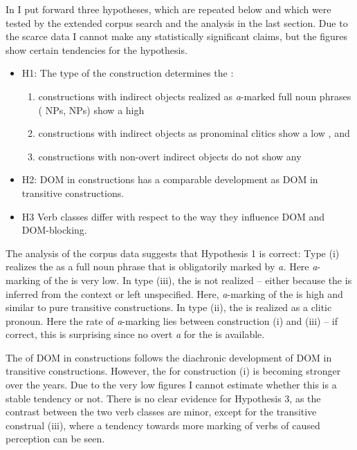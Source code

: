 \documentclass[output=paper]{LSP/langsci}
\begin{document}
In  I put forward three hypotheses, which are repeated below and which were tested by the extended corpus search and the analysis in the last section. Due to the scarce data I cannot make any statistically significant claims, but the figures show certain tendencies for the hypothesis.
\begin{itemize}
\item H1: The type of the  construction determines the :
\begin{enumerate}[label=\roman*]
 \item constructions with indirect objects realized as \textit{a}-marked full noun phrases ( NPs,  NPs) show a high 
 \item constructions with indirect objects as pronominal clitics show a low , and 
 \item constructions with non-overt indirect objects do not show any 
\end{enumerate}

\item H2: DOM in  constructions has a comparable development as DOM in transitive constructions.
\item H3 Verb classes differ with respect to the way they influence DOM and DOM-blocking.
\end{itemize}

The analysis of the corpus data suggests that Hypothesis 1 is correct: Type (i) realizes the  as a full noun phrase that is obligatorily marked by \textit{a.} Here \textit{a}-marking of the  is very low. In type (iii), the  is not realized – either because the  is inferred from the context or left unspecified. Here, \textit{a}-marking of the  is high and similar to pure transitive constructions. In type (ii), the  is realized as a clitic pronoun. Here the rate of \textit{a}-marking lies between construction (i) and (iii) – if correct, this is surprising since no overt \textit{a} for the  is available.

The  of DOM in  constructions follows the dia\-chro\-nic development of DOM in transitive constructions. However, the  for construction (i) is becoming stronger over the years. Due to the very low figures I cannot estimate whether this is a stable tendency or not. There is no clear evidence for Hypothesis 3, as the contrast between the two verb classes are minor, except for the transitive construal (iii), where a tendency towards more marking of verbs of caused perception can be seen.
\end{document}
